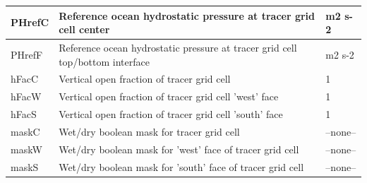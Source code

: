 \begin{longtable}{|m{}|m{}|m{}|}
PHrefC &Reference ocean hydrostatic pressure at tracer grid cell center &m2 s-2  \\ \hline
PHrefF &Reference ocean hydrostatic pressure at tracer grid cell top/bottom interface &m2 s-2  \\ \hline
hFacC &Vertical open fraction of tracer grid cell &1  \\ \hline
hFacW &Vertical open fraction of tracer grid cell 'west' face &1  \\ \hline
hFacS &Vertical open fraction of tracer grid cell 'south' face &1  \\ \hline
maskC &Wet/dry boolean mask for tracer grid cell &--none--  \\ \hline
maskW &Wet/dry boolean mask for 'west' face of tracer grid cell &--none--  \\ \hline
maskS &Wet/dry boolean mask for 'south' face of tracer grid cell &--none--  \\ \hline
\end{longtable}

\newp
\pagebreak
